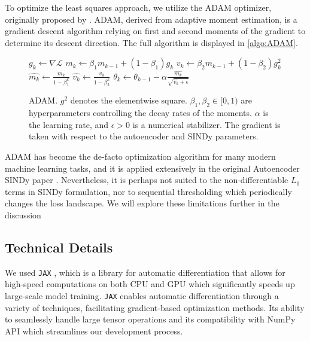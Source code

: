 To optimize the least squares approach, we utilize the \textsc{ADAM} optimizer, originally proposed by \textcite{Adam}. \textsc{ADAM}, derived from adaptive moment estimation, is a gradient descent algorithm relying on first and second moments of the gradient to determine its descent direction. The full algorithm is displayed in \autoref{algo:ADAM}.
\begin{figure}[h]
    \begin{algorithm}[H]
    \caption{\textsc{ADAM}. $g^2$ denotes the elementwise square. $\beta_1,\beta_2\in [0,1) $ are hyperparameters controlling the decay rates of the moments. $\alpha$ is the learning rate, and $\epsilon>0$ is a numerical stabilizer. 
    The gradient is taken with respect to the autoencoder and SINDy parameters.}
    \label{algo:ADAM} 
       \begin{algorithmic}
        \State \( g_{k} \gets \nabla\mathcal{L} \)
        \State \(m_k \gets \beta_1 m_{k-1} + (1-\beta_1)g_k\) 
        \State \(v_k \gets \beta_2 m_{k-1} + (1-\beta_2)g_k^2\)
        \State \(\hat{m_k} \gets \frac{m_k}{1-\beta_1^k}\)
        \State \(\hat{v_k} \gets \frac{v_k}{1-\beta_2^k}\)
        \State \(\theta_k \gets \theta_{k-1} - \alpha \frac{ \hat{m_k}}{\sqrt{\hat{v_k}+ \epsilon}}\)
        \end{algorithmic}
    \end{algorithm}
\end{figure}


\textsc{ADAM} has become the de-facto optimization algorithm for many modern machine learning tasks, and it is applied extensively in the original Autoencoder SINDy paper \cite{Champion_2019}. Nevertheless, it is perhaps not suited to the non-differentiable $L_1$ terms in SINDy formulation, nor to sequential thresholding which periodically changes the loss landscape. We will explore these limitations further in the discussion 

\subsection{Technical Details}
We used \verb|JAX| \cite{jax2018github}, which is a library for automatic differentiation that allows for high-speed computations on both CPU and GPU which significantly speeds up large-scale model training. \verb|JAX| enables automatic differentiation through a variety of techniques, facilitating gradient-based optimization methods. Its ability to seamlessly handle large tensor operations and its compatibility with NumPy API which streamlines our development process. 


